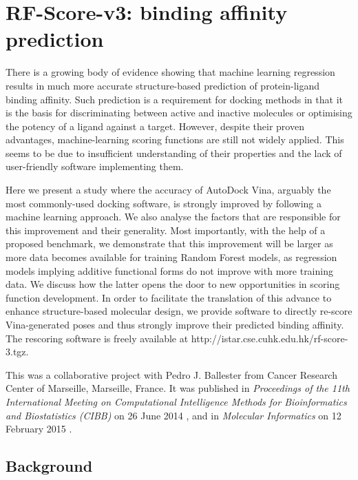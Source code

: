 \chapter{RF-Score-v3: binding affinity prediction}
\label{rfscore3}

There is a growing body of evidence showing that machine learning regression results in much more accurate structure-based prediction of protein-ligand binding affinity. Such prediction is a requirement for docking methods in that it is the basis for discriminating between active and inactive molecules or optimising the potency of a ligand against a target. However, despite their proven advantages, machine-learning scoring functions are still not widely applied. This seems to be due to insufficient understanding of their properties and the lack of user-friendly software implementing them.

Here we present a study where the accuracy of AutoDock Vina, arguably the most commonly-used docking software, is strongly improved by following a machine learning approach. We also analyse the factors that are responsible for this improvement and their generality. Most importantly, with the help of a proposed benchmark, we demonstrate that this improvement will be larger as more data becomes available for training Random Forest models, as regression models implying additive functional forms do not improve with more training data. We discuss how the latter opens the door to new opportunities in scoring function development. In order to facilitate the translation of this advance to enhance structure-based molecular design, we provide software to directly re-score Vina-generated poses and thus strongly improve their predicted binding affinity. The rescoring software is freely available at http://istar.cse.cuhk.edu.hk/rf-score-3.tgz.

This was a collaborative project with Pedro J. Ballester from Cancer Research Center of Marseille, Marseille, France. It was published in \textit{Proceedings of the 11th International Meeting on Computational Intelligence Methods for Bioinformatics and Biostatistics (CIBB)} on 26 June 2014 \citep{1433}, and in \textit{Molecular Informatics} on 12 February 2015 \citep{1647}.

\section{Background}

